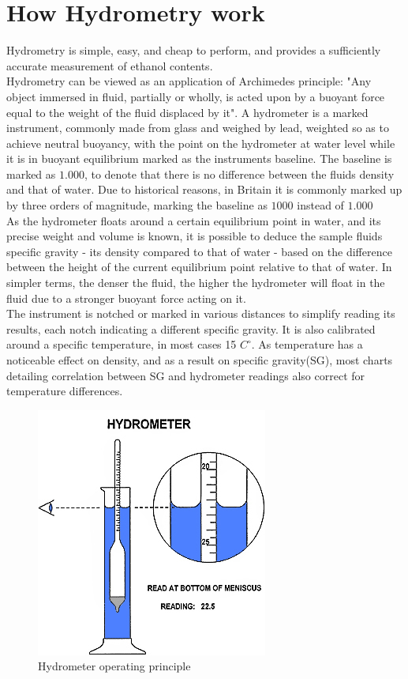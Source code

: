 \documentclass[twoside]{ctuthesis}
\theoremstyle{plain}
\theoremstyle{definition}
\theoremstyle{note}
\begin{document}
\section{How Hydrometry work}
Hydrometry is simple, easy, and cheap to perform, and provides a sufficiently accurate measurement of ethanol contents.\\
Hydrometry can be viewed as an application of Archimedes principle: "Any object immersed in fluid, partially or wholly, is acted upon by a buoyant force equal to the weight of the fluid displaced by it". A hydrometer is a marked instrument, commonly made from glass and weighed by lead\cite{Ethanol_Measurement}, weighted so as to achieve neutral buoyancy, with the point on the hydrometer at water level while it is in buoyant equilibrium marked as the instruments baseline. The baseline is marked as $1.000$, to denote that there is no difference between the fluids density and that of water. Due to historical reasons, in Britain it is commonly marked up by three orders of magnitude, marking the baseline as $1000$\cite{Brewing_Science} instead of $1.000$\\
As the hydrometer floats around a certain equilibrium point in water, and its precise weight and volume is known, it is possible to deduce the sample fluids specific gravity - its density compared to that of water - based on the difference between the height of the current equilibrium point relative to that of water. In simpler terms, the denser the fluid, the higher the hydrometer will float in the fluid due to a stronger buoyant force acting on it.\\
The instrument is notched or marked in various distances to simplify reading its results, each notch indicating a different specific gravity. It is also calibrated around a specific temperature, in most cases 15 $C^{\circ}$\cite{Ethanol_Measurement}. As temperature has a noticeable effect on density, and as a result on specific gravity(SG), most charts detailing correlation between SG and hydrometer readings also correct for temperature differences.\\


\begin{figure}[H]
	\centering
	\includegraphics[scale=0.7]{hydrometer}
	\caption{Hydrometer operating principle \cite{Hydrometer_Pic}}
\end{figure}
\end{document}
